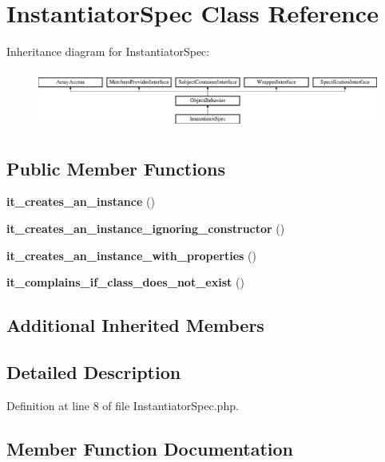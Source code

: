 \section{Instantiator\+Spec Class Reference}
\label{classspec_1_1_php_spec_1_1_util_1_1_instantiator_spec}
Inheritance diagram for Instantiator\+Spec\+:\begin{figure}[H]
\begin{center}
\leavevmode
\includegraphics[height=1.953488cm]{classspec_1_1_php_spec_1_1_util_1_1_instantiator_spec}
\end{center}
\end{figure}
\subsection*{Public Member Functions}
\begin{DoxyCompactItemize}
\item 
{\bf it\+\_\+creates\+\_\+an\+\_\+instance} ()
\item 
{\bf it\+\_\+creates\+\_\+an\+\_\+instance\+\_\+ignoring\+\_\+constructor} ()
\item 
{\bf it\+\_\+creates\+\_\+an\+\_\+instance\+\_\+with\+\_\+properties} ()
\item 
{\bf it\+\_\+complains\+\_\+if\+\_\+class\+\_\+does\+\_\+not\+\_\+exist} ()
\end{DoxyCompactItemize}
\subsection*{Additional Inherited Members}


\subsection{Detailed Description}


Definition at line 8 of file Instantiator\+Spec.\+php.



\subsection{Member Function Documentation}
